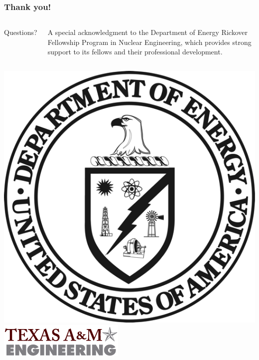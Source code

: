 \documentclass[compress,10pt]{beamer}
\newlength \figwidth
\begin{document}
\typeout{***********************************************************************************}

\begin{frame}[plain]
   \frametitle{Thank you!}

\vspace{25mm}

\begin{columns}[b]


\centering

{\Large Questions?}

\vspace{9mm}
\footnotesize
A special acknowledgment to the Department of Energy Rickover Fellowship Program in Nuclear Engineering, which provides strong support to its fellows and their professional development.

\end{columns}

\vspace{10mm}

\begin{columns}[b]

\centering
{}\includegraphics[width=0.35\figwidth]{images/DOE_logo.png}\\

\centering
{}\includegraphics[width=0.70\figwidth]{images/tamu_engineering.png}\\

\end{columns}

\end{frame}
\end{document}
